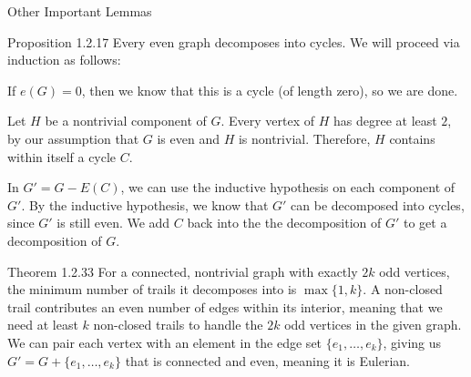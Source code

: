\documentclass[10pt]{extarticle}
\begin{document}
\begin{problem}{Other Important Lemmas}
  \begin{problem}{Proposition 1.2.17}
    Every even graph decomposes into cycles.
    \tcblower
    We will proceed via induction as follows:
    \begin{description}[font=\normalfont\scshape]
      \item[Base Case] If $e(G) = 0$, then we know that this is a cycle (of length zero), so we are done.
      \item[Inductive Hypothesis] Let $H$ be a nontrivial component of $G$. Every vertex of $H$ has degree at least $2$, by our assumption that $G$ is even and $H$ is nontrivial. Therefore, $H$ contains within itself a cycle $C$.
      \item[Proof] In $G' = G - E(C)$, we can use the inductive hypothesis on each component of $G'$. By the inductive hypothesis, we know that $G'$ can be decomposed into cycles, since $G'$ is still even. We add $C$ back into the the decomposition of $G'$ to get a decomposition of $G$.
    \end{description}
  \end{problem}
  \begin{problem}{Theorem 1.2.33}
    For a connected, nontrivial graph with exactly $2k$ odd vertices, the minimum number of trails it decomposes into is $\max\{1,k\}$. 
    \tcblower
    A non-closed trail contributes an even number of edges within its interior, meaning that we need at least $k$ non-closed trails to handle the $2k$ odd vertices in the given graph. We can pair each vertex with an element in the edge set $\{e_1,\dots,e_k\}$, giving us $G' = G + \{e_1,\dots,e_k\}$ that is connected and even, meaning it is Eulerian. 
  \end{problem}
\end{problem}
\end{document}
